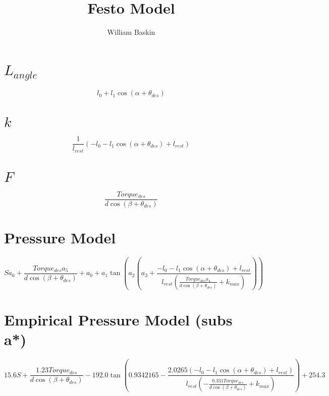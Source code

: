 \documentclass[12pt, letterpaper, oneside, notitlepage, onecolumn]{article}
\author{William Baskin}
\title{Festo Model}
\begin{document}
\maketitle

\section{$L_{angle}$}
\begin{equation}
l_{0} + l_{1} \cos{\left (\alpha + \theta_{des} \right )}
\end{equation}
\section{$k$}
\begin{equation}
\frac{1}{l_{rest}} \left(- l_{0} - l_{1} \cos{\left (\alpha + \theta_{des}
\right )} + l_{rest}\right)
\end{equation}
\section{$F$}
\begin{equation}
\frac{Torque_{des}}{d \cos{\left (\beta + \theta_{des} \right )}}
\end{equation}
\section{Pressure Model}
\begin{equation}
S a_{6} + \frac{Torque_{des} a_{5}}{d \cos{\left (\beta + \theta_{des} \right
)}} + a_{0} + a_{1} \tan{\left (a_{2} \left(a_{3} + \frac{- l_{0} - l_{1}
\cos{\left (\alpha + \theta_{des} \right )} + l_{rest}}{l_{rest}
\left(\frac{Torque_{des} a_{4}}{d \cos{\left (\beta + \theta_{des} \right )}} +
k_{max}\right)}\right) \right )}
\end{equation}
\section{Empirical Pressure Model (subs a*)}
\begin{equation}
15.6 S + \frac{1.23 Torque_{des}}{d \cos{\left (\beta + \theta_{des} \right )}}
- 192.0 \tan{\left (0.9342165 - \frac{2.0265 \left(- l_{0} - l_{1} \cos{\left
  (\alpha + \theta_{des} \right )} + l_{rest}\right)}{l_{rest} \left(-
  \frac{0.331 Torque_{des}}{d \cos{\left (\beta + \theta_{des} \right )}} +
  k_{max}\right)} \right )} + 254.3
  \end{equation}
\end{document}
